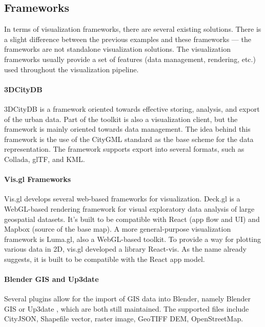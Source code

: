\subsection{Frameworks}
\label{sec:frameworks}
In terms of visualization frameworks, there are several existing solutions. There is a slight difference between the previous examples and these frameworks --- the frameworks are not standalone visualization solutions. The visualization frameworks usually provide a set of features (data management, rendering, etc.) used throughout the visualization pipeline. 

\paragraph{3DCityDB}
3DCityDB \cite{yao20183dcitydb} is a framework oriented towards effective storing, analysis, and export of the urban data. Part of the toolkit is also a visualization client, but the framework is mainly oriented towards data management. The idea behind this framework is the use of the CityGML standard as the base scheme for the data representation. The framework supports export into several formats, such as Collada, glTF, and KML.

\paragraph{Vis.gl Frameworks}
Vis.gl \cite{visgl} develops several web-based frameworks for visualization. Deck.gl is a WebGL-based rendering framework for visual exploratory data analysis of large geospatial datasets. It's built to be compatible with React (app flow and UI) and Mapbox (source of the base map). A more general-purpose visualization framework is Luma.gl, also a WebGL-based toolkit. To provide a way for plotting various data in 2D, vis.gl developed a library React-vis. As the name already suggests, it is built to be compatible with the React app model.

\paragraph{Blender GIS and Up3date}
Several plugins allow for the import of GIS data into Blender, namely Blender GIS \cite{blendergis} or Up3date \cite{up3date}, which are both still maintained. The supported files include CityJSON, Shapefile vector, raster image, GeoTIFF DEM, OpenStreetMap. 


